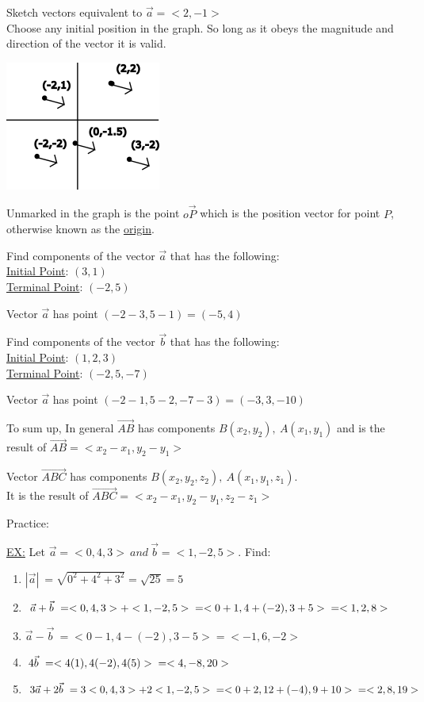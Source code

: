 \documentclass[10pt]{article}
\begin{document}
Sketch vectors equivalent to $\vec{a} = <2, -1>$ \\Choose any initial position in the graph. So long as it obeys the magnitude and direction of the vector it is valid.

\includegraphics{equivalentvectors2d}

Unmarked in the graph is the point $o \vec{P}  $ which is the position vector for point $P$, otherwise known as the \underline{origin}.

Find components of the vector $\vec{a}  $ that has the following:\\\underline{Initial Point}: $(3,1)$\\\underline{Terminal Point}: $(-2,5)$

Vector $\vec{a}  $ has point $(-2-3,5-1)=(-5,4)$

Find components of the vector $\vec{b}  $ that has the following:\\\underline{Initial Point}: $(1,2,3)$\\\underline{Terminal Point}: $(-2,5,-7)$

Vector $\vec{a}  $ has point $(-2-1,5-2,-7-3)=(-3,3,-10)$

To sum up,
In general $\vec{AB}  $ has components $B(x_2,y_2),\ A(x_1,y_1) $ and is the result of $\vec{AB} =<x_2-x_1,y_2-y_1> $

Vector $\vec{ABC}  $ has components $B(x_2,y_2,z_2),\ A(x_1,y_1,z_1)$.\\It is the result of $\vec{ABC} =<x_2-x_1,y_2-y_1,z_2-z_1> $ 

Practice:

\underline{EX:} Let $\vec{a} =<0,4,3>\ and\ \vec{b} =<1,-2,5>.  $ Find:

\begin{enumerate}
	\item $|\vec{a} |\ = \sqrt{0^2+4^2+3^2}=\sqrt{25}=5 $
	\item $\vec{a} +\vec{b}\ =<0,4,3>+<1,-2,5>\\=<0+1,4+(-2),3+5>\\=<1,2,8>  $
	\item $\vec{a} -\vec{b}\ =<0-1,4-(-2),3-5>=<-1,6,-2> $
	\item $4\vec{b}\  =<4(1),4(-2),4(5)>\\=<4,-8,20>$ 
	\item $3 \vec{a} +2 \vec{b}\ = 3<0,4,3>+2<1,-2,5>\\=<0+2,12+(-4),9+10>\\=<2,8,19>  $
\end{enumerate}
\end{document}
